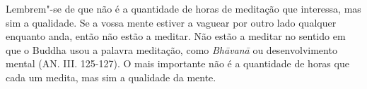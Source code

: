 Lembrem"-se de que não é a quantidade de horas de meditação que
interessa, mas sim a qualidade. Se a vossa mente estiver a vaguear por
outro lado qualquer enquanto anda, então não estão a meditar. Não estão
a meditar no sentido em que o Buddha usou a palavra meditação, como
\emph{Bhāvanā} ou desenvolvimento mental (AN. III. 125-127). O mais
importante não é a quantidade de horas que cada um medita, mas sim a
qualidade da mente.

